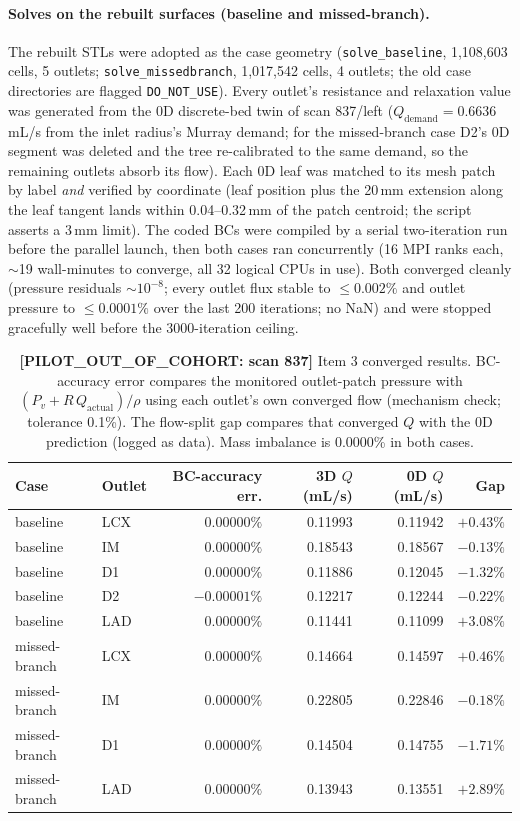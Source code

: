 \documentclass[11pt]{article}
\begin{document}
\paragraph{Solves on the rebuilt surfaces (baseline and missed-branch).} The rebuilt STLs were adopted as the
case geometry (\texttt{solve\_\allowbreak{}baseline}, 1,108,603 cells, 5 outlets; \texttt{solve\_\allowbreak{}missedbranch}, 1,017,542
cells, 4 outlets; the old case directories are flagged \texttt{DO\_\allowbreak{}NOT\_\allowbreak{}USE}). Every outlet's resistance and
relaxation value was generated from the 0D discrete-bed twin of scan 837/left ($Q_\text{demand}=0.6636$\,mL/s from
the inlet radius's Murray demand; for the missed-branch case D2's 0D segment was deleted and the tree
re-calibrated to the same demand, so the remaining outlets absorb its flow). Each 0D leaf was matched to its mesh
patch by label \emph{and} verified by coordinate (leaf position plus the 20\,mm extension along the leaf tangent
lands within 0.04--0.32\,mm of the patch centroid; the script asserts a 3\,mm limit). The coded BCs were compiled by a
serial two-iteration run before the parallel launch, then both cases ran concurrently (16 MPI ranks each,
$\sim$19 wall-minutes to converge, all 32 logical CPUs in use). Both converged cleanly (pressure residuals
$\sim10^{-8}$; every outlet flux stable to $\leq0.002\%$ and outlet pressure to $\leq0.0001\%$ over the last 200
iterations; no NaN) and were stopped gracefully well before the 3000-iteration ceiling.

\begin{table}[H]
\centering
\caption{\textbf{[PILOT\_OUT\_OF\_COHORT: scan 837]} Item 3 converged results. BC-accuracy error compares the monitored outlet-patch pressure with
$(P_v+R\,Q_\text{actual})/\rho$ using each outlet's own converged flow (mechanism check; tolerance 0.1\%). The
flow-split gap compares that converged $Q$ with the 0D prediction (logged as data). Mass imbalance is 0.0000\% in both cases.}
\begin{tabular}{llrrrr}
\toprule
Case & Outlet & BC-accuracy err. & 3D $Q$ (mL/s) & 0D $Q$ (mL/s) & Gap \\
\midrule
baseline & LCX & $0.00000\%$ & 0.11993 & 0.11942 & $+0.43\%$ \\
baseline & IM  & $0.00000\%$ & 0.18543 & 0.18567 & $-0.13\%$ \\
baseline & D1  & $0.00000\%$ & 0.11886 & 0.12045 & $-1.32\%$ \\
baseline & D2  & $-0.00001\%$ & 0.12217 & 0.12244 & $-0.22\%$ \\
baseline & LAD & $0.00000\%$ & 0.11441 & 0.11099 & $+3.08\%$ \\
missed-branch & LCX & $0.00000\%$ & 0.14664 & 0.14597 & $+0.46\%$ \\
missed-branch & IM  & $0.00000\%$ & 0.22805 & 0.22846 & $-0.18\%$ \\
missed-branch & D1  & $0.00000\%$ & 0.14504 & 0.14755 & $-1.71\%$ \\
missed-branch & LAD & $0.00000\%$ & 0.13943 & 0.13551 & $+2.89\%$ \\
\bottomrule
\end{tabular}
\end{table}
\end{document}
